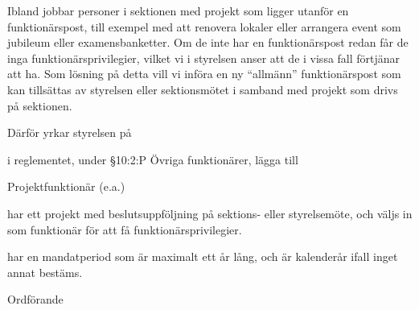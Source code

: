 \documentclass[../_main/handlingar.tex]{subfiles}
\begin{document}

Ibland jobbar personer i sektionen med projekt som ligger utanför en funktionärspost, till exempel med att renovera lokaler eller arrangera event som jubileum eller examensbanketter. Om de inte har en funktionärspost redan får de inga funktionärsprivilegier, vilket vi i styrelsen anser att de i vissa fall förtjänar att ha. Som lösning på detta vill vi införa en ny ``allmänn'' funktionärspost som kan tillsättas av styrelsen eller sektionsmötet i samband med projekt som drivs på sektionen.

Därför yrkar styrelsen på

\begin{attsatser}
    \att i reglementet, under \S10:2:P Övriga funktionärer, lägga till\par
    \begin{itshape}
        Projektfunktionär (e.a.)
        \begin{tightdashlist}
            \item har ett projekt med beslutsuppföljning på sektions- eller styrelsemöte, och väljs in som funktionär för att få funktionärsprivilegier.
            \item har en mandatperiod som är maximalt ett år lång, och är kalenderår ifall inget annat bestäms.
        \end{tightdashlist}
    \end{itshape}
\end{attsatser}

\begin{signatures}{1}
    \ist
    \signature{\ordf}{Ordförande}
\end{signatures}
\end{document}
